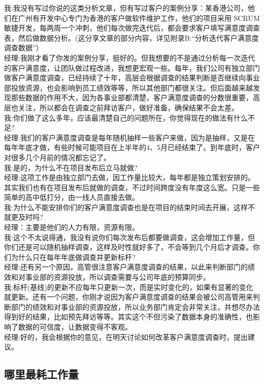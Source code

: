 我:我没有写过你说的这类分析文章，但有写过客户的案例分享：某香港公司，他们在广州有开发中心专门为香港的客户做软件维护工作，他们的项目采用
SCRUM
敏捷开发，每两周一个冲刺，他们每次做完迭代后，都会要求客户填写满意度调查表，然后做数据分析。(这分享文章的部分内容，详见附录B:``分析迭代客户满意度调查数据''）\\
经理:我刚才看了你发的案例分享，挺好的。但我想要的不是通过分析每一次迭代的客户满意度，让团队做过程改进，我想更宏观一些。每年，我们公司有独立部门做客户满意度调查，已经持续了十年，高层会根据调查的结果判断是否继续向事业部投放资源，也会影响到员工绩效等等，所以其他部门都很关注。但后面越来越发现那些数据的作用不大，因为各事业部都清楚，客户满意度调查的分数很重要，高层也关注，所以都会在调查之前拜访客户，做好准备，确保结果不会太差。\\
我:你们做了这么多年，应该最清楚自己的问题所在，你觉得现在的做法有什么不足?\\
经理:我们的客户满意度调查是每年随机抽样一些客户来做，因为是抽样，又是在每年年底才做，有些时候可能项目在上半年的4、5月已经结束了。到年底时，客户对很多几个月前的情况都忘记了。\\
我:是的，为什么不在项目发布后立马就做?\\
经理:这项工作是由独立部门去做，因工作量比较大，每年都是独立策划安排的。其实我们也有在项目发布后就做的调查，不过时间跨度没有年度这么宽。只是一些简单的高中低打分，由一线人员直接去做。\\
我:为什么不能安排你们的客户满意度调查也是在项目的结束时间去开展，这样不就更及时吗?\\
经理：主要是他们的人力有限，资源有限。\\
我:这个不太说得通，我没有说你们每次发布后都要做调查，这会增加工作量，但你们还是可以随机抽样调查，这样及时性就好多了，不会等到几个月后才调查。你们为什么只在每年年底做调查并更新标杆?\\
经理:还有另一个原因，高管很注意客户满意度调查的结果，以此来判断部门的绩效和对事业部的资源投放，所以调查需要与公司年底的预算同步。\\
我:标杆(基线)的更新不应每年只更新一次，而是实时变化的，如果有显著的变化就更新。还有一个问题，你刚才说因为客户满意度调查的结果会被公司高管用来判断部门的绩效和对事业部的资源投放，所以业务部门肯定会非常关注，并想尽办法得到好的结果，比如预先拜访等等。其实这个不但污染了数据本身的准确性，也影响了数据的可信度，让数据变得不客观。\\
经理:好的，我会根据你的意见，在明天讨论如何改革客户满意度调查时，提出建议。\\


\hypertarget{ux54eaux91ccux6700ux8017ux5de5ux4f5cux91cf}{%
\subsection{哪里最耗工作量}\label{ux54eaux91ccux6700ux8017ux5de5ux4f5cux91cf}}

